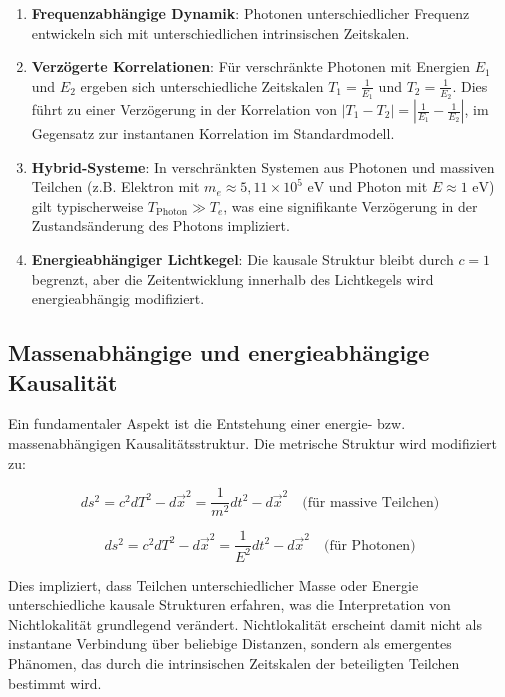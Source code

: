 \documentclass[a4paper,12pt]{article}
\begin{document}
	\begin{enumerate}
		\item \textbf{Frequenzabhängige Dynamik}: Photonen unterschiedlicher Frequenz entwickeln sich mit unterschiedlichen intrinsischen Zeitskalen.
		
		\item \textbf{Verzögerte Korrelationen}: Für verschränkte Photonen mit Energien $E_1$ und $E_2$ ergeben sich unterschiedliche Zeitskalen $T_1 = \frac{1}{E_1}$ und $T_2 = \frac{1}{E_2}$. Dies führt zu einer Verzögerung in der Korrelation von $|T_1 - T_2| = \left|\frac{1}{E_1} - \frac{1}{E_2}\right|$, im Gegensatz zur instantanen Korrelation im Standardmodell.
		
		\item \textbf{Hybrid-Systeme}: In verschränkten Systemen aus Photonen und massiven Teilchen (z.B. Elektron mit $m_e \approx 5{,}11 \times 10^5 \text{ eV}$ und Photon mit $E \approx 1 \text{ eV}$) gilt typischerweise $T_{\text{Photon}} \gg T_e$, was eine signifikante Verzögerung in der Zustandsänderung des Photons impliziert.
		
		\item \textbf{Energieabhängiger Lichtkegel}: Die kausale Struktur bleibt durch $c = 1$ begrenzt, aber die Zeitentwicklung innerhalb des Lichtkegels wird energieabhängig modifiziert.
	\end{enumerate}
	
	\subsection{Massenabhängige und energieabhängige Kausalität}
	Ein fundamentaler Aspekt ist die Entstehung einer energie- bzw. massenabhängigen Kausalitätsstruktur. Die metrische Struktur wird modifiziert zu:
	
	\begin{equation}
		ds^2 = c^2dT^2 - d\vec{x}^2 = \frac{1}{m^2}dt^2 - d\vec{x}^2 \quad \text{(für massive Teilchen)}
	\end{equation}
	
	\begin{equation}
		ds^2 = c^2dT^2 - d\vec{x}^2 = \frac{1}{E^2}dt^2 - d\vec{x}^2 \quad \text{(für Photonen)}
	\end{equation}
	
	Dies impliziert, dass Teilchen unterschiedlicher Masse oder Energie unterschiedliche kausale Strukturen erfahren, was die Interpretation von Nichtlokalität grundlegend verändert. Nichtlokalität erscheint damit nicht als instantane Verbindung über beliebige Distanzen, sondern als emergentes Phänomen, das durch die intrinsischen Zeitskalen der beteiligten Teilchen bestimmt wird.
	
\end{document}
